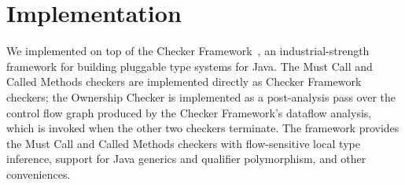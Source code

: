 \section{Implementation}
\label{sec:implementation}

We implemented \tool on top of the Checker Framework~\cite{PapiACPE2008},
an industrial-strength framework for building pluggable type systems
for Java. The Must Call and Called Methods checkers are implemented
directly as Checker Framework checkers; the Ownership Checker is
implemented as a post-analysis pass over the control flow graph
produced by the Checker Framework's dataflow analysis, which is invoked
when the other two checkers terminate. The framework provides the
Must Call and Called Methods checkers with flow-sensitive local type
inference, support for Java generics and qualifier polymorphism, and
other conveniences.
